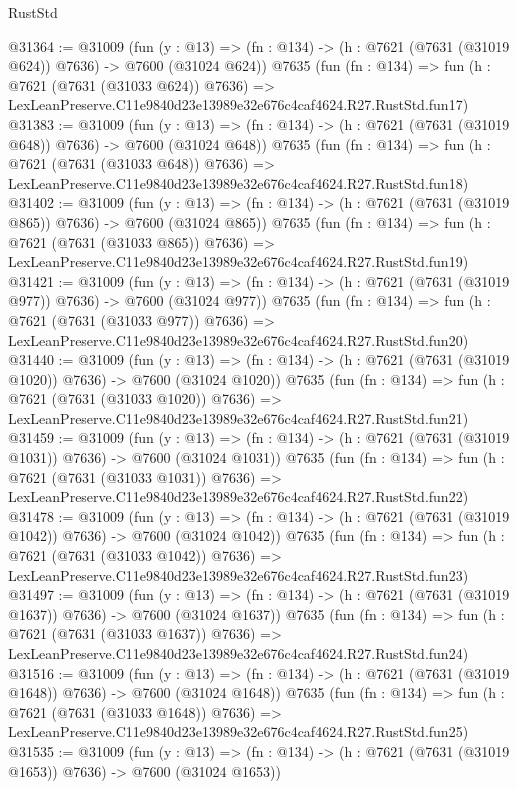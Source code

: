 \begin{lexlean}{RustStd}
\begin{coremodule}
@31364 := @31009
    (fun (y : @13) => (fn : @134) -> (h : @7621 (@7631 (@31019 @624)) @7636) -> @7600 (@31024 @624))
    @7635
    (fun (fn : @134) =>
    fun (h : @7621 (@7631 (@31033 @624)) @7636) =>
    LexLeanPreserve.C11e9840d23e13989e32e676c4caf4624.R27.RustStd.fun17)
@31383 := @31009
    (fun (y : @13) => (fn : @134) -> (h : @7621 (@7631 (@31019 @648)) @7636) -> @7600 (@31024 @648))
    @7635
    (fun (fn : @134) =>
    fun (h : @7621 (@7631 (@31033 @648)) @7636) =>
    LexLeanPreserve.C11e9840d23e13989e32e676c4caf4624.R27.RustStd.fun18)
@31402 := @31009
    (fun (y : @13) => (fn : @134) -> (h : @7621 (@7631 (@31019 @865)) @7636) -> @7600 (@31024 @865))
    @7635
    (fun (fn : @134) =>
    fun (h : @7621 (@7631 (@31033 @865)) @7636) =>
    LexLeanPreserve.C11e9840d23e13989e32e676c4caf4624.R27.RustStd.fun19)
@31421 := @31009
    (fun (y : @13) => (fn : @134) -> (h : @7621 (@7631 (@31019 @977)) @7636) -> @7600 (@31024 @977))
    @7635
    (fun (fn : @134) =>
    fun (h : @7621 (@7631 (@31033 @977)) @7636) =>
    LexLeanPreserve.C11e9840d23e13989e32e676c4caf4624.R27.RustStd.fun20)
@31440 := @31009
    (fun (y : @13) =>
    (fn : @134) -> (h : @7621 (@7631 (@31019 @1020)) @7636) -> @7600 (@31024 @1020))
    @7635
    (fun (fn : @134) =>
    fun (h : @7621 (@7631 (@31033 @1020)) @7636) =>
    LexLeanPreserve.C11e9840d23e13989e32e676c4caf4624.R27.RustStd.fun21)
@31459 := @31009
    (fun (y : @13) =>
    (fn : @134) -> (h : @7621 (@7631 (@31019 @1031)) @7636) -> @7600 (@31024 @1031))
    @7635
    (fun (fn : @134) =>
    fun (h : @7621 (@7631 (@31033 @1031)) @7636) =>
    LexLeanPreserve.C11e9840d23e13989e32e676c4caf4624.R27.RustStd.fun22)
@31478 := @31009
    (fun (y : @13) =>
    (fn : @134) -> (h : @7621 (@7631 (@31019 @1042)) @7636) -> @7600 (@31024 @1042))
    @7635
    (fun (fn : @134) =>
    fun (h : @7621 (@7631 (@31033 @1042)) @7636) =>
    LexLeanPreserve.C11e9840d23e13989e32e676c4caf4624.R27.RustStd.fun23)
@31497 := @31009
    (fun (y : @13) =>
    (fn : @134) -> (h : @7621 (@7631 (@31019 @1637)) @7636) -> @7600 (@31024 @1637))
    @7635
    (fun (fn : @134) =>
    fun (h : @7621 (@7631 (@31033 @1637)) @7636) =>
    LexLeanPreserve.C11e9840d23e13989e32e676c4caf4624.R27.RustStd.fun24)
@31516 := @31009
    (fun (y : @13) =>
    (fn : @134) -> (h : @7621 (@7631 (@31019 @1648)) @7636) -> @7600 (@31024 @1648))
    @7635
    (fun (fn : @134) =>
    fun (h : @7621 (@7631 (@31033 @1648)) @7636) =>
    LexLeanPreserve.C11e9840d23e13989e32e676c4caf4624.R27.RustStd.fun25)
@31535 := @31009
    (fun (y : @13) =>
    (fn : @134) -> (h : @7621 (@7631 (@31019 @1653)) @7636) -> @7600 (@31024 @1653))

\end{coremodule}
\end{lexlean}
